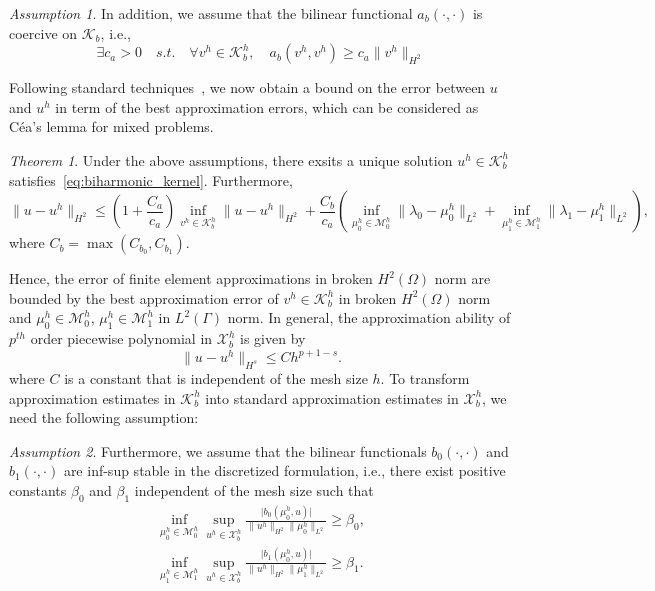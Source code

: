 \documentclass[preprint,12pt]{elsarticle}
\theoremstyle{remark}
\newtheorem{assumption}{Assumption}
\newtheorem{theorem}{Theorem}
\begin{document}
\begin{assumption}
    In addition, we assume that the bilinear functional $a_b(\cdot,\cdot)$ is coercive on $\mathcal{K}_b$, i.e.,
    \begin{equation}
        \exists{c_a>0} \quad\textit{s.t.}\quad\forall{v^h}\in\mathcal{K}_b^h,\quad a_b(v^h,v^h)\geq{c_a\|{v^h}\|_{H^2}}
    \end{equation}
\end{assumption}
Following standard techniques~\cite{brenner_mathematical_2007}, we now obtain a bound on the error between $u$ and $u^h$ in term of the best approximation errors, which can be considered as C\'ea's lemma for mixed problems.

\begin{theorem}
    Under the above assumptions, there exsits a unique solution $u^h\in{\mathcal{K}_b^h}$ satisfies~\eqref{eq:biharmonic_kernel}. Furthermore, 
    \begin{equation}
        \|u-u^h\|_{H^2}\leq{\left(1+\frac{C_a}{c_a}\right)}\inf_{v^h\in{\mathcal{K}_b^h}}\|u-u^h\|_{H^2}+\frac{C_{b}}{c_a}\left(\inf_{\mu_0^h\in{\mathcal{M}_0^h}}\|\lambda_0-\mu_0^h\|_{L^2}+\inf_{\mu_1^h\in{\mathcal{M}_1^h}}\|\lambda_1-\mu_1^h\|_{L^2}\right),
    \end{equation}
    where $C_b=\max\left({C_{b_0},C_{b_1}}\right)$.
\end{theorem}

Hence, the error of finite element approximations in broken $H^2(\Omega)$ norm are bounded by the best approximation error of $v^h\in{\mathcal{K}_b^h}$ in broken $H^2(\Omega)$ norm and $\mu_0^h\in{\mathcal{M}_0^h}$, $\mu_1^h\in{\mathcal{M}_1^h}$ in $L^2(\Gamma)$ norm. In general, the approximation ability of $p^{th}$ order piecewise polynomial in $\mathcal{X}_b^h$ is given by
\begin{equation}
    \|u-u^h\|_{H^s}\leq{Ch^{p+1-s}}.
\end{equation}
where $C$ is a constant that is independent of the mesh size $h$. To transform approximation estimates in $\mathcal{K}_b^h$ into standard approximation estimates in $\mathcal{X}_b^h$, we need the following assumption:
\begin{assumption}\label{aspt:inf-sub}
    Furthermore, we assume that the bilinear functionals $b_0(\cdot,\cdot)$ and $b_1(\cdot,\cdot)$ are inf-sup stable in the discretized formulation, i.e., there exist positive constants $\beta_0$ and $\beta_1$ independent of the mesh size such that
    \begin{align}
        \inf_{\mu_0^h\in\mathcal{M}_0^h}\sup_{u^h\in\mathcal{X}_b^h}\frac{\vert{b_0\left({\mu_0^h,u}\right)}\vert}{\|u^h\|_{H^2}\|\mu_0^h\|_{L^2}}\geq{\beta_0},\\
        \inf_{\mu_1^h\in\mathcal{M}_1^h}\sup_{u^h\in\mathcal{X}_b^h}\frac{\vert{b_1\left({\mu_0^h,u}\right)}\vert}{\|u^h\|_{H^2}\|\mu_1^h\|_{L^2}}\geq{\beta_1}.
    \end{align}
\end{assumption}
\end{document}
